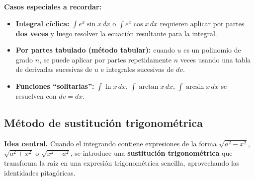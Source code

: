 \documentclass[12pt, letterpaper]{article}
\newcommand{\dx}{\,dx}
\begin{document}
\vspace{4pt}

\begin{cuadroinfo}
\small\textbf{Casos especiales a recordar:}
\begin{itemize}[leftmargin=*, itemsep=3pt]
  \item \textbf{Integral cíclica:} $\int e^x\sin x\dx$ o $\int e^x\cos x\dx$
        requieren aplicar por partes \textbf{dos veces} y luego resolver la ecuación
        resultante para la integral.
  \item \textbf{Por partes tabulado (método tabular):} cuando $u$ es un polinomio
        de grado $n$, se puede aplicar por partes repetidamente $n$ veces usando
        una tabla de derivadas sucesivas de $u$ e integrales sucesivas de $dv$.
  \item \textbf{Funciones ``solitarias'':} $\int \ln x\dx$, $\int \arctan x\dx$,
        $\int \arcsin x\dx$ se resuelven con $dv = dx$.
\end{itemize}
\end{cuadroinfo}

\vspace{8pt}

\subsection{Método de sustitución trigonométrica}

\begin{cuadrosolucion}
\textbf{Idea central.}\quad
Cuando el integrando contiene expresiones de la forma
$\sqrt{a^2 - x^2}$, $\sqrt{a^2 + x^2}$ o $\sqrt{x^2 - a^2}$,
se introduce una \textbf{sustitución trigonométrica} que transforma la raíz
en una expresión trigonométrica sencilla, aprovechando las identidades
pitagóricas.
\end{cuadrosolucion}

\vspace{4pt}
\end{document}
